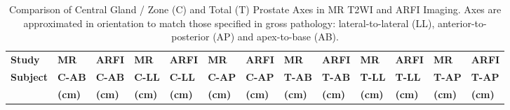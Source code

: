 \begin{table}
\centering
\caption{Comparison of Central Gland / Zone (C) and Total (T) Prostate Axes in MR T2WI and ARFI Imaging.  Axes are approximated in orientation to match those specified in gross pathology: lateral-to-lateral (LL), anterior-to-posterior (AP) and apex-to-base (AB).}
\begin{tabular}{|l|l|l|l|l|l|l|l|l|l|l|l|l|} \hline
{\bf Study} & {\bf MR} & {\bf ARFI} & {\bf MR} & {\bf ARFI} & {\bf MR} & {\bf ARFI} & {\bf MR} & {\bf ARFI} & {\bf MR} & {\bf ARFI} & {\bf MR} & {\bf ARFI} \\ 
{\bf Subject} & {\bf C-AB} & {\bf C-AB} & {\bf C-LL} & {\bf C-LL} & {\bf C-AP} & {\bf C-AP} & {\bf T-AB} & {\bf T-AB} & {\bf T-LL} & {\bf T-LL} & {\bf T-AP} & {\bf T-AP} \\
 & {\bf (cm)} & {\bf (cm)} & {\bf (cm)} & {\bf (cm)} & {\bf (cm)} & {\bf (cm)} & {\bf (cm)} & {\bf (cm)} & {\bf (cm)} & {\bf (cm)} & {\bf (cm)} & {\bf (cm)} \\ \hline

\hline
\end{tabular}
\label{tab:mr_arfi_axes}
\end{table}
